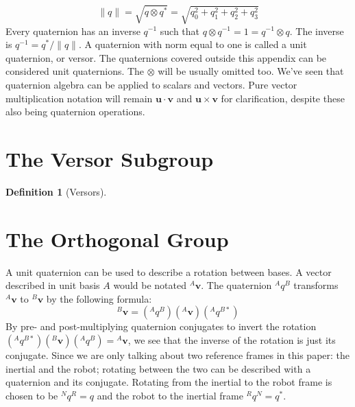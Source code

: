 \documentclass{amsart}
\theoremstyle{definition}
\newtheorem{definition}[theorem]{Definition}
\theoremstyle{remark}
\numberwithin{equation}{section}
\begin{document}
\begin{equation}
  \|q\| = \sqrt{q\otimes q^*} = \sqrt{q_0^2+q_1^2+q_2^2+q_3^2}
\end{equation}
Every quaternion has an inverse $q^{-1}$ such that $q\otimes q^{-1}=1=q^{-1}\otimes q$. The inverse is $q^{-1}=q^*/\|q\|$. A quaternion with norm equal to one is called a unit quaternion, or versor. The quaternions covered outside this appendix can be considered unit quaternions. The $\otimes$ will be usually omitted too. We've seen that quaternion algebra can be applied to scalars and vectors. Pure vector multiplication notation will remain $\mathbf{u}\cdot\mathbf{v}$ and $\mathbf{u}\times\mathbf{v}$ for clarification, despite these also being quaternion operations.





\section{The Versor Subgroup}
\begin{definition}[Versors]
\end{definition}




\section{The Orthogonal Group}
A unit quaternion can be used to describe a rotation between bases. A vector described in unit basis $A$ would be notated $^A\mathbf{v}$. The quaternion $^Aq^B$ transforms $^A\mathbf{v}$ to $^B\mathbf{v}$ by the following formula:
\begin{equation}
  {^B\mathbf{v}} = \left({^Aq^B}\right)\left( {^A\mathbf{v}}\right)\left( {^Aq^{B*}}\right)
\end{equation}
By pre- and post-multiplying quaternion conjugates to invert the rotation $\left({^Aq^{B*}}\right)\left({^B\mathbf{v}}\right)\left({^Aq^B}\right)={^A\mathbf{v}}$, we see that the inverse of the rotation is just its conjugate. Since we are only talking about two reference frames in this paper: the inertial and the robot; rotating between the two can be described with a quaternion and its conjugate. Rotating from the inertial to the robot frame is chosen to be ${^Nq^R}=q$ and the robot to the inertial frame ${^Rq^N}=q^*$.
\end{document}
